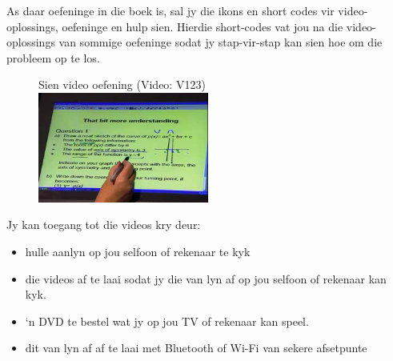 {

As daar oefeninge in die boek is, sal jy die ikons en short codes vir video-oplossings, oefeninge en hulp sien. Hierdie short-codes vat jou na die video-oplossings van sommige oefeninge sodat jy stap-vir-stap kan sien hoe om die probleem op te los. \par

\begin{figure}[h]
\begin{center}
Sien video oefening  (Video: V123)\\ 
\includegraphics[width=0.5\textwidth]{title_images/mindsetexercise.png}
\end{center}
\end{figure}
Jy kan toegang tot die videos kry deur:
\begin{itemize}
\item hulle aanlyn op jou selfoon of rekenaar te kyk
\item die videos af te laai sodat jy die van lyn af op jou selfoon of rekenaar kan kyk.
\item ‘n DVD te bestel wat jy op jou TV of rekenaar kan speel.
\item dit van lyn af af te laai met Bluetooth of Wi-Fi van sekere afsetpunte
\end{itemize}
}


